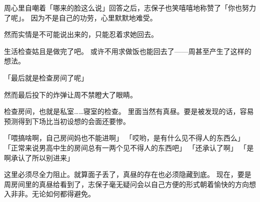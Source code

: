 周心里自嘲着「哪来的脸这么说」回答之后，志保子也笑嘻嘻地称赞了「你也努力了呢」。
因为不是自己的功劳，心里默默地难受。

然而实情是不可能说出来的，只能忍着求她回去。

生活检查姑且是做完了吧。
或许不用求做饭也能回去了——周甚至产生了这样的想法。

「最后就是检查房间了呢」

然而最后投下的炸弹让周不禁瞪大了眼睛。

检查房间，也就是私室……寝室的检查。
里面当然有真昼。要是被发现的话，容易预测得到下场比当初设想的会面还要惨。

「喂搞啥啊，自己房间妈也不能进啊」
「哎哟，是有什么见不得人的东西么」
「正常来说男高中生的房间总有一两个见不得人的东西吧」
「还承认了啊」
「是啊承认了所以别进来」

这里必须尽全力阻止。就算面子丢了，真昼的存在也必须隐藏到底。
现在，要是周房间里的真昼给看到了，志保子毫无疑问会以自己方便的形式朝着愉快的方向想入非非。无论如何都得避免。
